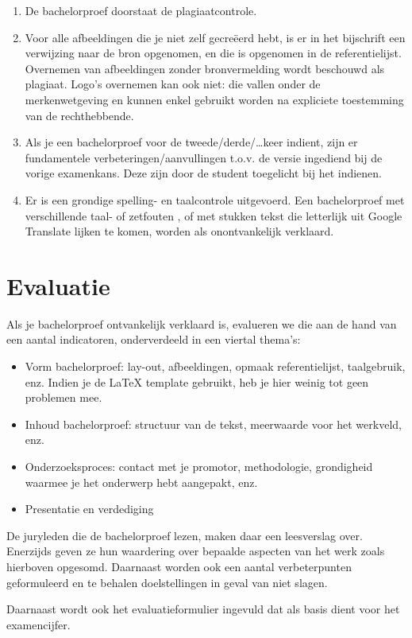 \begin{enumerate}
 	\item De bachelorproef doorstaat de plagiaatcontrole.
 	\item Voor alle afbeeldingen die je niet zelf gecreëerd hebt, is er in het bijschrift een verwijzing  naar  de  bron  opgenomen,  en  die  is  opgenomen  in  de  referentielijst. Overnemen van afbeeldingen zonder bronvermelding wordt beschouwd als plagiaat. Logo’s overnemen kan ook niet: die vallen onder de merkenwetgeving en kunnen enkel gebruikt worden na expliciete toestemming van de rechthebbende.
 	\item Als je een bachelorproef voor de tweede/derde/\dots keer indient, zijn er fundamentele verbeteringen/aanvullingen t.o.v. de versie ingediend bij de vorige examenkans. Deze zijn door de student toegelicht bij het indienen.
 	\item Er is een grondige spelling- en taalcontrole uitgevoerd.  Een bachelorproef met verschillende taal- of zetfouten , of met stukken tekst die letterlijk uit Google Translate lijken te komen, worden als onontvankelijk verklaard. 
\end{enumerate}

\section{Evaluatie}
Als je bachelorproef ontvankelijk verklaard is, evalueren we die aan de hand van een aantal indicatoren, onderverdeeld in een viertal thema’s:
\begin{itemize}
	\item Vorm bachelorproef: lay-out, afbeeldingen, opmaak referentielijst, taalgebruik, enz. Indien je de \LaTeX{} template gebruikt, heb je hier weinig tot geen problemen mee.
	\item Inhoud bachelorproef: structuur van de tekst, meerwaarde voor het werkveld, enz.
	\item Onderzoeksproces: contact met je promotor, methodologie, grondigheid waarmee je het onderwerp hebt aangepakt, enz.
	\item Presentatie en verdediging
\end{itemize}

De juryleden die de bachelorproef lezen, maken daar een leesverslag over.  Enerzijds geven ze hun waardering over bepaalde aspecten van het werk zoals hierboven opgesomd. Daarnaast worden ook een aantal verbeterpunten geformuleerd en te behalen doelstellingen in geval van niet slagen. 

Daarnaast wordt ook het evaluatieformulier ingevuld dat als basis dient voor het examencijfer.

